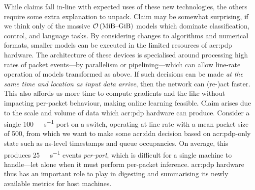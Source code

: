 While claims  fall in-line with expected uses of these new technologies, the others require some extra explanation to unpack.
Claim  may be somewhat surprising, if we think only of the massive $\mathcal{O}\left(\text{\unit{\mebi\byte}--\unit{\gibi\byte}}\right)$ models which dominate classification, control, and language tasks.
By considering changes to algorithms and numerical formats, smaller models can be executed in the limited resources of \gls{acr:pdp} hardware.
The architecture of these devices is specialised around processing high rates of packet events---by parallelism or pipelining---which can allow line-rate operation of models transformed as above.
If such decisions can be made \emph{at the same time and location as input data arrive}, then the network can (re-)act faster.
This also affords us more time to compute gradients and the like without impacting per-packet behaviour, making online learning feasible.
Claim  arises due to the scale and volume of data which \gls{acr:pdp} hardware can produce.
Consider a single \qty{100}{\giga\bit\per\second} port on a switch, operating at line rate with a mean packet size of \qty{500}{\byte}, from which we want to make some \gls{acr:ddn} decision based on \gls{acr:pdp}-only state such as \unit{\nano\second}-level timestamps and queue occupancies.
On average, this produces \qty[per-symbol=p,sticky-per=true]{25}{\mega\packet\per\second} events \emph{per-port}, which is difficult for a single machine to handle---let alone when it must perform per-packet inference.
\gls{acr:pdp} hardware thus has an important role to play in digesting and summarising its newly available metrics for host machines.



